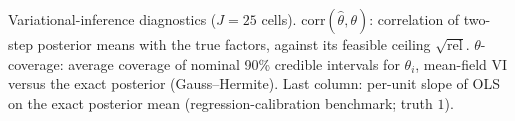 \begin{table}[t]
\centering
\caption{Variational-inference diagnostics ($J=25$ cells).
$\mathrm{corr}(\hat\theta,\theta)$: correlation of two-step posterior means
with the true factors, against its feasible ceiling
$\sqrt{\mathrm{rel}}$.  $\theta$-coverage: average coverage of nominal
90\% credible intervals for $\theta_i$, mean-field VI versus the exact
posterior (Gauss--Hermite).  Last column: per-unit slope of OLS on the
exact posterior mean (regression-calibration benchmark; truth $1$).}
\label{tab:sim-vi-appendix}

\end{table}
